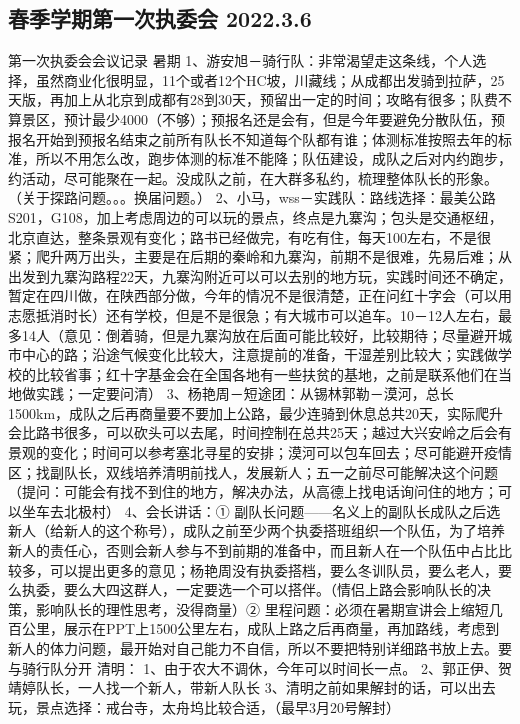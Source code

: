 \documentclass{ctexbook}
\begin{document}
\subsection{春季学期第一次执委会 2022.3.6}

第一次执委会会议记录
暑期
1、游安旭－骑行队：非常渴望走这条线，个人选择，虽然商业化很明显，11个或者12个HC坡，川藏线；从成都出发骑到拉萨，25天版，再加上从北京到成都有28到30天，预留出一定的时间；攻略有很多；队费不算景区，预计最少4000（不够）；预报名还是会有，但是今年要避免分散队伍，预报名开始到预报名结束之前所有队长不知道每个队都有谁；体测标准按照去年的标准，所以不用怎么改，跑步体测的标准不能降；队伍建设，成队之后对内约跑步，约活动，尽可能聚在一起。没成队之前，在大群多私约，梳理整体队长的形象。（关于探路问题。。。换届问题。）
2、小马，wss－实践队：路线选择：最美公路S201，G108，加上考虑周边的可以玩的景点，终点是九寨沟；包头是交通枢纽，北京直达，整条景观有变化；路书已经做完，有吃有住，每天100左右，不是很紧；爬升两万出头，主要是在后期的秦岭和九寨沟，前期不是很难，先易后难；从出发到九寨沟路程22天，九寨沟附近可以可以去别的地方玩，实践时间还不确定，暂定在四川做，在陕西部分做，今年的情况不是很清楚，正在问红十字会（可以用志愿抵消时长）还有学校，但是不是很急；有大城市可以追车。10－12人左右，最多14人（意见：倒着骑，但是九寨沟放在后面可能比较好，比较期待；尽量避开城市中心的路；沿途气候变化比较大，注意提前的准备，干湿差别比较大；实践做学校的比较省事；红十字基金会在全国各地有一些扶贫的基地，之前是联系他们在当地做实践；一定要问清）
3、杨艳周－短途团：从锡林郭勒－漠河，总长1500km，成队之后再商量要不要加上公路，最少连骑到休息总共20天，实际爬升会比路书很多，可以砍头可以去尾，时间控制在总共25天；越过大兴安岭之后会有景观的变化；时间可以参考塞北寻星的安排；漠河可以包车回去；尽可能避开疫情区；找副队长，双线培养清明前找人，发展新人；五一之前尽可能解决这个问题（提问：可能会有找不到住的地方，解决办法，从高德上找电话询问住的地方；可以坐车去北极村）
4、会长讲话：① 副队长问题——名义上的副队长成队之后选新人（给新人的这个称号），成队之前至少两个执委搭班组织一个队伍，为了培养新人的责任心，否则会新人参与不到前期的准备中，而且新人在一个队伍中占比比较多，可以提出更多的意见；杨艳周没有执委搭档，要么冬训队员，要么老人，要么执委，要么大四这群人，一定要选一个可以搭伴。（情侣上路会影响队长的决策，影响队长的理性思考，没得商量）② 里程问题：必须在暑期宣讲会上缩短几百公里，展示在PPT上1500公里左右，成队上路之后再商量，再加路线，考虑到新人的体力问题，最开始对自己能力不自信，所以不要把特别详细路书放上去。要与骑行队分开
清明：
1、由于农大不调休，今年可以时间长一点。
2、郭正伊、贺靖婷队长，一人找一个新人，带新人队长
3、清明之前如果解封的话，可以出去玩，景点选择：戒台寺，太舟坞比较合适，（最早3月20号解封）
\end{document}
